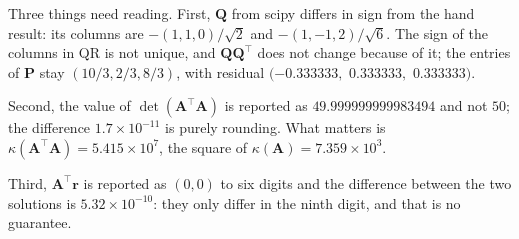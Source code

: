 Three things need reading. First, $\mathbf{Q}$ from scipy differs in sign from the hand result:
its columns are $-(1,1,0)/\sqrt{2}$ and $-(1,-1,2)/\sqrt{6}$. The sign of the columns in QR is not unique,
and $\mathbf{Q}\mathbf{Q}^{\top}$ does not change because of it; the entries of $\mathbf{P}$ stay
$(10/3,2/3,8/3)$, with residual $(-0.333333,$ $0.333333,$ $0.333333)$.

Second, the value of $\det(\mathbf{A}^{\top}\mathbf{A})$ is reported as $49.999999999983494$ and not
$50$; the difference $1.7\times10^{-11}$ is purely rounding. What matters is
$\kappa(\mathbf{A}^{\top}\mathbf{A})=5.415\times10^{7}$, the square of
$\kappa(\mathbf{A})=7.359\times10^{3}$.

Third, $\mathbf{A}^{\top}\mathbf{r}$ is reported as $(0,0)$ to six digits and the difference between
the two solutions is $5.32\times10^{-10}$: they only differ in the ninth digit, and that
is no guarantee.

